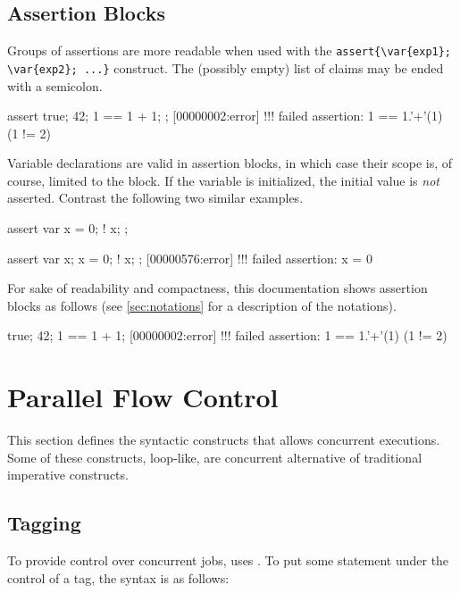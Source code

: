 \subsection{Assertion Blocks}

Groups of assertions are more readable when used with the
\lstinline|assert{\var{exp1}; \var{exp2}; ...}| construct.  The (possibly
empty) list of claims may be ended with a semicolon.

\begin{urbiscript}
assert
{
  true;
  42;
  1 == 1 + 1;
};
[00000002:error] !!! failed assertion: 1 == 1.'+'(1) (1 != 2)
\end{urbiscript}

Variable declarations are valid in assertion blocks, in which case their
scope is, of course, limited to the block.  If the variable is initialized,
the initial value is \emph{not} asserted.  Contrast the following two
similar examples.

\begin{urbiscript}
assert
{
  var x = 0;
  ! x;
};

assert
{
  var x;
  x = 0;
  ! x;
};
[00000576:error] !!! failed assertion: x = 0
\end{urbiscript}

For sake of readability and compactness, this documentation shows assertion
blocks as follows (see \autoref{sec:notations} for a description of the
notations).

\begin{urbiassert}
true;
42;
1 == 1 + 1;
[00000002:error] !!! failed assertion: 1 == 1.'+'(1) (1 != 2)
\end{urbiassert}


\section{Parallel Flow Control}
\label{sec:lang:conc}
This section defines the syntactic constructs that allows concurrent
executions.  Some of these constructs, loop-like, are concurrent alternative
of traditional imperative constructs.

\subsection{Tagging}
\label{sec:lang:tag}
To provide control over concurrent jobs, \us uses .  To
put some statement under the control of a tag, the syntax is as follows:



